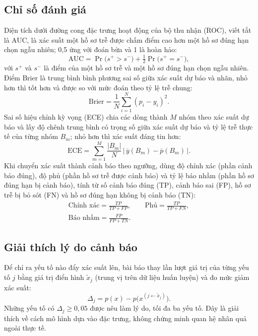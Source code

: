 \documentclass[journal]{IEEEtran}
\begin{document}
\subsection{Chỉ số đánh giá}
Diện tích dưới đường cong đặc trưng hoạt động của bộ thu nhận (ROC), viết tắt là AUC, là xác suất một hồ sơ trễ được chấm điểm cao hơn một hồ sơ đúng hạn chọn ngẫu nhiên; 0,5 ứng với đoán bừa và 1 là hoàn hảo:
\begin{equation}
\mathrm{AUC}=\Pr\bigl(s^{+}>s^{-}\bigr)+\tfrac{1}{2}\Pr\bigl(s^{+}=s^{-}\bigr),
\end{equation}
với $s^{+}$ và $s^{-}$ là điểm của một hồ sơ trễ và một hồ sơ đúng hạn chọn ngẫu nhiên. Điểm Brier \cite{brier1950} là trung bình bình phương sai số giữa xác suất dự báo và nhãn, nhỏ hơn thì tốt hơn và được so với mức đoán theo tỷ lệ trễ chung:
\begin{equation}
\mathrm{Brier}=\frac{1}{N}\sum_{i=1}^{N}(p_i-y_i)^2.
\end{equation}
Sai số hiệu chỉnh kỳ vọng (ECE) chia các dòng thành $M$ nhóm theo xác suất dự báo và lấy độ chênh trung bình có trọng số giữa xác suất dự báo và tỷ lệ trễ thực tế của từng nhóm $B_m$; nhỏ hơn thì xác suất đáng tin hơn:
\begin{equation}
\mathrm{ECE}=\sum_{m=1}^{M}\frac{|B_m|}{N}\,\bigl|\,\overline{y}(B_m)-\overline{p}(B_m)\,\bigr|.
\end{equation}
Khi chuyển xác suất thành cảnh báo theo ngưỡng, dùng độ chính xác (phần cảnh báo đúng), độ phủ (phần hồ sơ trễ được cảnh báo) và tỷ lệ báo nhầm (phần hồ sơ đúng hạn bị cảnh báo), tính từ số cảnh báo đúng (TP), cảnh báo sai (FP), hồ sơ trễ bị bỏ sót (FN) và hồ sơ đúng hạn không bị cảnh báo (TN):
\begin{equation}
\begin{gathered}
\text{Chính xác}=\frac{TP}{TP+FP},\qquad \text{Phủ}=\frac{TP}{TP+FN},\\[4pt]
\text{Báo nhầm}=\frac{FP}{FP+TN}.
\end{gathered}
\end{equation}

\subsection{Giải thích lý do cảnh báo}
Để chỉ ra yếu tố nào đẩy xác suất lên, bài báo thay lần lượt giá trị của từng yếu tố $j$ bằng giá trị điển hình $\tilde{x}_j$ (trung vị trên dữ liệu huấn luyện) và đo mức giảm xác suất:
\begin{equation}
\Delta_j=p(x)-p\bigl(x^{(j\leftarrow\tilde{x}_j)}\bigr).
\end{equation}
Những yếu tố có $\Delta_j\ge 0{,}05$ được nêu làm lý do, tối đa ba yếu tố. Đây là giải thích về cách mô hình dựa vào đặc trưng, không chứng minh quan hệ nhân quả ngoài thực tế.
\end{document}
